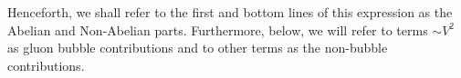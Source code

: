 \documentclass[a4paper,11pt]{article}
\numberwithin{equation}{section}
\newcommand{\bJ}{\mathbf{J}}
\newcommand{\ldot}{\!\cdot\!}
\newcommand{\bd}[1]{\mathbf{#1}}
\begin{document}

Henceforth, we shall refer to the first and bottom lines of this expression as the Abelian and Non-Abelian parts. Furthermore, below, we will refer to terms $\sim V^2$ as gluon bubble contributions and to other terms as the non-bubble contributions. 
\end{document}
